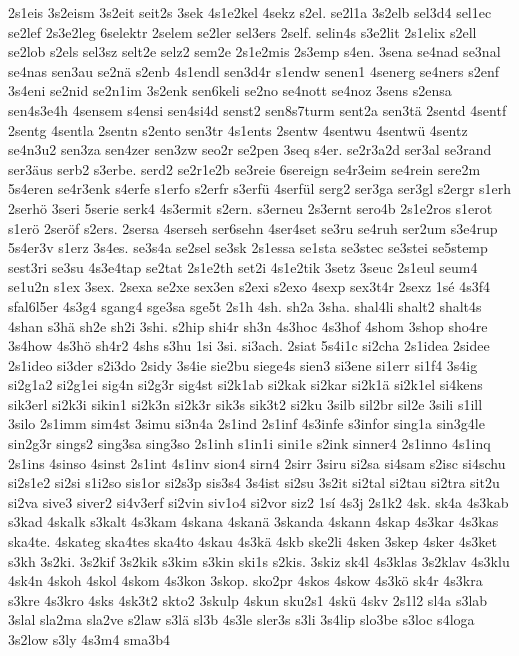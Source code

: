 {2s1eis
3s2eism
3s2eit
seit2s
3sek
4s1e2kel
4sekz
s2el.
se2l1a
3s2elb
sel3d4
sel1ec
se2lef
2s3e2leg
6selektr
2selem
se2ler
sel3ers
2self.
selin4s
s3e2lit
2s1elix
s2ell
se2lob
s2els
sel3sz
selt2e
selz2
sem2e
2s1e2mis
2s3emp
s4en.
3sena
se4nad
se3nal
se4nas
sen3au
se2nä
s2enb
4s1endl
sen3d4r
s1endw
senen1
4senerg
se4ners
s2enf
3s4eni
se2nid
se2n1im
3s2enk
sen6keli
se2no
se4nott
se4noz
3sens
s2ensa
sen4s3e4h
4sensem
s4ensi
sen4si4d
senst2
sen8s7turm
sent2a
sen3tä
2sentd
4sentf
2sentg
4sentla
2sentn
s2ento
sen3tr
4s1ents
2sentw
4sentwu
4sentwü
4sentz
se4n3u2
sen3za
sen4zer
sen3zw
seo2r
se2pen
3seq
s4er.
se2r3a2d
ser3al
se3rand
ser3äus
serb2
s3erbe.
serd2
se2r1e2b
se3reie
6sereign
se4r3eim
se4rein
sere2m
5s4eren
se4r3enk
s4erfe
s1erfo
s2erfr
s3erfü
4serfül
serg2
ser3ga
ser3gl
s2ergr
s1erh
2serhö
3seri
5serie
serk4
4s3ermit
s2ern.
s3erneu
2s3ernt
sero4b
2s1e2ros
s1erot
s1erö
2seröf
s2ers.
2sersa
4serseh
ser6sehn
4ser4set
se3ru
se4ruh
ser2um
s3e4rup
5s4er3v
s1erz
3s4es.
se3s4a
se2sel
se3sk
2s1essa
se1sta
se3stec
se3stei
se5stemp
sest3ri
se3su
4s3e4tap
se2tat
2s1e2th
set2i
4s1e2tik
3setz
3seuc
2s1eul
seum4
se1u2n
s1ex
3sex.
2sexa
se2xe
sex3en
s2exi
s2exo
4sexp
sex3t4r
2sexz
1sé
4s3f4
sfal6l5er
4s3g4
sgang4
sge3sa
sge5t
2s1h
4sh.
sh2a
3sha.
shal4li
shalt2
shalt4s
4shan
s3hä
sh2e
sh2i
3shi.
s2hip
shi4r
sh3n
4s3hoc
4s3hof
4shom
3shop
sho4re
3s4how
4s3hö
sh4r2
4shs
s3hu
1si
3si.
si3ach.
2siat
5s4i1c
si2cha
2s1idea
2sidee
2s1ideo
si3der
s2i3do
2sidy
3s4ie
sie2bu
siege4s
sien3
si3ene
si1err
si1f4
3s4ig
si2g1a2
si2g1ei
sig4n
si2g3r
sig4st
si2k1ab
si2kak
si2kar
si2k1ä
si2k1el
si4kens
sik3erl
si2k3i
sikin1
si2k3n
si2k3r
sik3s
sik3t2
si2ku
3silb
sil2br
sil2e
3sili
s1ill
3silo
2s1imm
sim4st
3simu
si3n4a
2s1ind
2s1inf
4s3infe
s3infor
sing1a
sin3g4le
sin2g3r
sings2
sing3sa
sing3so
2s1inh
s1in1i
sini1e
s2ink
sinner4
2s1inno
4s1inq
2s1ins
4sinso
4sinst
2s1int
4s1inv
sion4
sirn4
2sirr
3siru
si2sa
si4sam
s2isc
si4schu
si2s1e2
si2si
s1i2so
sis1or
si2s3p
sis3s4
3s4ist
si2su
3s2it
si2tal
si2tau
si2tra
sit2u
si2va
sive3
siver2
si4v3erf
si2vin
siv1o4
si2vor
siz2
1sí
4s3j
2s1k2
4sk.
sk4a
4s3kab
s3kad
4skalk
s3kalt
4s3kam
4skana
4skanä
3skanda
4skann
4skap
4s3kar
4s3kas
ska4te.
4skateg
ska4tes
ska4to
4skau
4s3kä
4skb
ske2li
4sken
3skep
4sker
4s3ket
s3kh
3s2ki.
3s2kif
3s2kik
s3kim
s3kin
ski1s
s2kis.
3skiz
sk4l
4s3klas
3s2klav
4s3klu
4sk4n
4skoh
4skol
4skom
4s3kon
3skop.
sko2pr
4skos
4skow
4s3kö
sk4r
4s3kra
s3kre
4s3kro
4sks
4sk3t2
skto2
3skulp
4skun
sku2s1
4skü
4skv
2s1l2
sl4a
s3lab
3slal
sla2ma
sla2ve
s2law
s3lä
sl3b
4s3le
sler3s
s3li
3s4lip
slo3be
s3loc
s4loga
3s2low
s3ly
4s3m4
sma3b4
}

